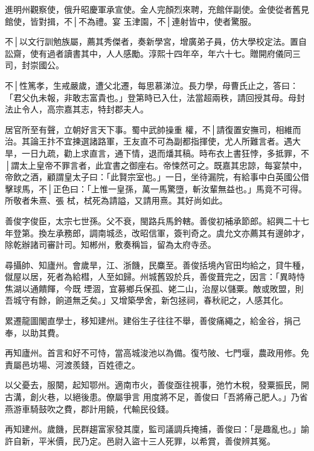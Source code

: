 \begin{pinyinscope}
 進明州觀察使，俄升昭慶軍承宣使。金人完顏烈來聘，充館伴副使。金使從者舊見館使，皆對揖，不│不為禮。宴
 玉津園，不│連射皆中，使者驚服。



 不│以文行訓勉族屬，薦其秀傑者，奏新學宮，增廣弟子員，仿大學校定法。置自訟齋，使有過者讀書其中，人人感勵。淳熙十四年卒，年六十七。贈開府儀同三司，封崇國公。



 不│性篤孝，生戒嚴歲，遭父北遷，每思慕涕泣。長力學，母曹氏止之，答曰：「君父仇未報，非敢志富貴也。」登第時已入仕，法當超兩秩，請回授其母。母封法止令人，高宗嘉其志，特封郡夫人。



 居官所至有聲，立朝好言天下事。蜀中武帥操重
 權，不│請復置安撫司，相維而治。其論王抃不宜揀選諸路軍，王友直不可為副都指揮使，尤人所難言者。遇大旱，一日九疏，勸上求直言，通下情，退而燔其稿。時布衣上書狂悖，多抵罪，不│謂太上皇帝不罪言者，此宜書之御座右。帝悚然可之。既嘉其忠諒，每宴禁中，帝飲之酒，顧謂皇太子曰：「此賢宗室也。」一日，坐待漏院，有給事中白英國公借擊球馬，不│正色曰：「上惟一皇孫，萬一馬驚墮，斬汝輩無益也。」馬竟不可得。所敬者朱熹、張
 栻，栻死為請謚，又請用熹。其好尚如此。



 善俊字俊臣，太宗七世孫。父不衰，閩路兵馬鈐轄。善俊初補承節郎。紹興二十七年登第。換左承務郎，調南城丞，改昭信軍，簽判奇之。虞允文亦薦其有邊帥才，除乾辦諸司審計司。知郴州，敷奏稱旨，留為太府寺丞。



 尋攝帥、知廬州。會歲旱，江、浙饑，民麋至。善俊括境內官田均給之，貸牛種，僦屋以居，死者為給槥，人至如歸。州城舊毀於兵，善俊葺完之，因言：「異時恃焦湖以通饋餫，今既
 堙涸，宜募鄉兵保孤、姥二山，治屋以儲粟。敵或敗盟，則吾城守有餘，餉道無乏矣。」又增築學舍，新包拯祠，春秋祀之，人感其化。



 累遷龍圖閣直學士，移知建州。建俗生子往往不舉，善俊痛繩之，給金谷，捐己奉，以助其費。



 再知廬州。首言和好不可恃，當高城浚池以為備。復芍陂、七門堰，農政用修。免責屬邑坊場、河渡羨錢，百姓德之。



 以父憂去，服闋，起知鄂州。適南市火，善俊亟往視事，弛竹木稅，發粟振民，開古溝，創火巷，以絕後患。僚屬爭言
 用度將不足，善俊曰「吾將瘠己肥人。」乃省燕游車騎鼓吹之費，郡計用饒，代輸民役錢。



 再知建州。歲饑，民群趨富家發其廩，監司議調兵掩捕，善俊曰：「是趣亂也。」諭許自新，平米價，民乃定。邑尉入盜十三人死罪，以希賞，善俊辨其冤。




\end{pinyinscope}
